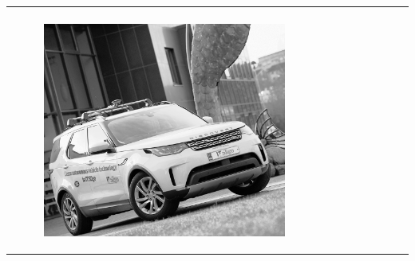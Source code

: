\begin{frame}
\begin{tabular}{ccc}
\begin{minipage}{0.3\textwidth}
        
        \end{minipage}\\
        \begin{minipage}{0.3\textwidth}
            \begin{figure}[H]

	    \includegraphics[width=\textwidth]{images/CAV15Equalised.jpg}
    \end{figure}
        \end{minipage}
        &
        \begin{minipage}{0.3\textwidth}
            
            \begin{figure}[H]


\end{figure}
\end{minipage}
\end{tabular}
\end{frame}
